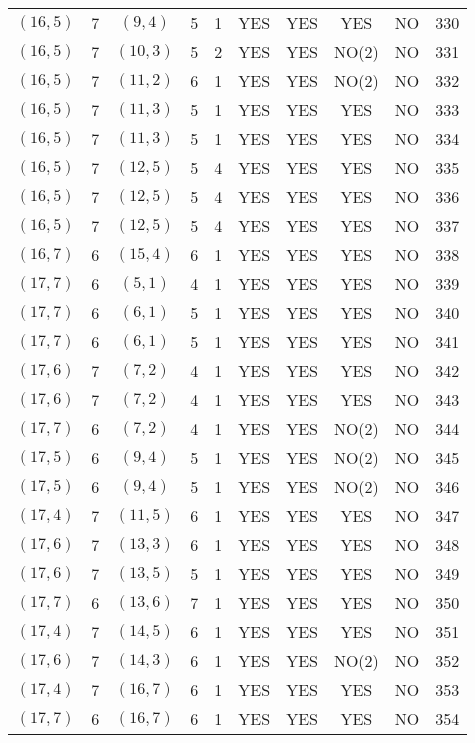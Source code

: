 \begin{longtable}{|c|c|c|c|c|c|c|c|c|c|}
$(16, 5)$ & 7 & $(9, 4)$ & 5 & 1 & YES & YES & YES & NO & 330\\
$(16, 5)$ & 7 & $(10, 3)$ & 5 & 2 & YES & YES & NO(2) & NO & 331\\
$(16, 5)$ & 7 & $(11, 2)$ & 6 & 1 & YES & YES & NO(2) & NO & 332\\
$(16, 5)$ & 7 & $(11, 3)$ & 5 & 1 & YES & YES & YES & NO & 333\\
$(16, 5)$ & 7 & $(11, 3)$ & 5 & 1 & YES & YES & YES & NO & 334\\
$(16, 5)$ & 7 & $(12, 5)$ & 5 & 4 & YES & YES & YES & NO & 335\\
$(16, 5)$ & 7 & $(12, 5)$ & 5 & 4 & YES & YES & YES & NO & 336\\
$(16, 5)$ & 7 & $(12, 5)$ & 5 & 4 & YES & YES & YES & NO & 337\\
$(16, 7)$ & 6 & $(15, 4)$ & 6 & 1 & YES & YES & YES & NO & 338\\
$(17, 7)$ & 6 & $(5, 1)$ & 4 & 1 & YES & YES & YES & NO & 339\\
$(17, 7)$ & 6 & $(6, 1)$ & 5 & 1 & YES & YES & YES & NO & 340\\
$(17, 7)$ & 6 & $(6, 1)$ & 5 & 1 & YES & YES & YES & NO & 341\\
$(17, 6)$ & 7 & $(7, 2)$ & 4 & 1 & YES & YES & YES & NO & 342\\
$(17, 6)$ & 7 & $(7, 2)$ & 4 & 1 & YES & YES & YES & NO & 343\\
$(17, 7)$ & 6 & $(7, 2)$ & 4 & 1 & YES & YES & NO(2) & NO & 344\\
$(17, 5)$ & 6 & $(9, 4)$ & 5 & 1 & YES & YES & NO(2) & NO & 345\\
$(17, 5)$ & 6 & $(9, 4)$ & 5 & 1 & YES & YES & NO(2) & NO & 346\\
$(17, 4)$ & 7 & $(11, 5)$ & 6 & 1 & YES & YES & YES & NO & 347\\
$(17, 6)$ & 7 & $(13, 3)$ & 6 & 1 & YES & YES & YES & NO & 348\\
$(17, 6)$ & 7 & $(13, 5)$ & 5 & 1 & YES & YES & YES & NO & 349\\
$(17, 7)$ & 6 & $(13, 6)$ & 7 & 1 & YES & YES & YES & NO & 350\\
$(17, 4)$ & 7 & $(14, 5)$ & 6 & 1 & YES & YES & YES & NO & 351\\
$(17, 6)$ & 7 & $(14, 3)$ & 6 & 1 & YES & YES & NO(2) & NO & 352\\
$(17, 4)$ & 7 & $(16, 7)$ & 6 & 1 & YES & YES & YES & NO & 353\\
$(17, 7)$ & 6 & $(16, 7)$ & 6 & 1 & YES & YES & YES & NO & 354\\

\end{longtable}
